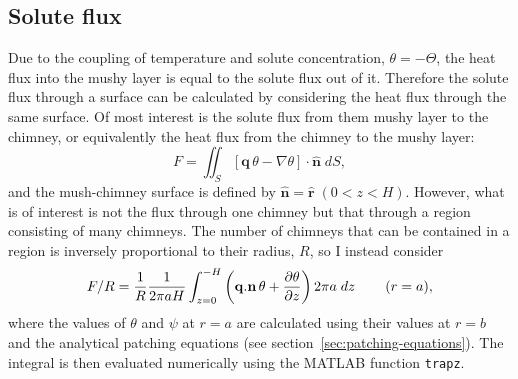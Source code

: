 \documentclass[11pt,twocolumn]{article}
\begin{document}
\begin{appendices}
  \section{Solute flux} \label{app:solute-flux}
Due to the coupling of temperature and solute concentration, $\theta=-\Theta$, the heat flux into the mushy layer is equal to the solute flux out of it. Therefore the solute flux through a surface can be calculated by considering the heat flux through the same surface. Of most interest is the solute flux from them mushy layer to the chimney, or equivalently the heat flux from the chimney to the mushy layer:
\begin{equation}
F = \iint_S \left[ \mathbf{q} \, \theta - \nabla \theta \right] \cdot \mathbf{\hat{n}} \; dS,
\end{equation}
and the mush-chimney surface is defined by $\mathbf{\hat{n}} = \mathbf{\hat{r}} \; (0 < z < H) $. However, what is of interest is not the flux through one chimney but that through a region consisting of many chimneys. The number of chimneys that can be contained in a region is inversely proportional to their radius, $R$, so I instead consider
 \begin{equation}
F/R = \frac{1}{R} \frac{1}{2 \pi a H} \int_{z=0}^{-H} \left( \mathbf{q}.\mathbf{n} \, \theta + \frac{\partial \theta}{\partial z} \right) 2 \pi a \; dz \hspace{5ex} (r=a),
\end{equation}
where the values of $\theta$ and $\psi$ at $r=a$ are calculated using their values at $r=b$ and the analytical patching equations (see section~\ref{sec:patching-equations}). The integral is then evaluated numerically using the MATLAB function \texttt{trapz}.













\end{appendices}
\end{document}
